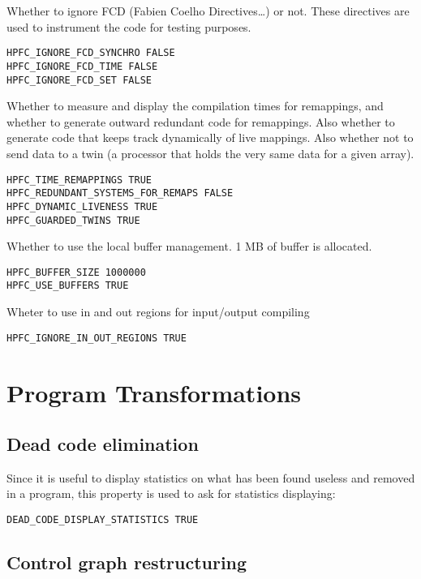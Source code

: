 Whether to ignore FCD (Fabien Coelho Directives\ldots) or not. These
directives are used to instrument the code for testing purposes.

\begin{verbatim}
HPFC_IGNORE_FCD_SYNCHRO FALSE
HPFC_IGNORE_FCD_TIME FALSE
HPFC_IGNORE_FCD_SET FALSE
\end{verbatim}

Whether to measure and display the compilation times for remappings,
and whether to generate outward redundant code for remappings. Also
whether to generate code that keeps track dynamically of live mappings. 
Also whether not to send data to a twin (a processor that holds the very
same data for a given array). 

\begin{verbatim}
HPFC_TIME_REMAPPINGS TRUE
HPFC_REDUNDANT_SYSTEMS_FOR_REMAPS FALSE
HPFC_DYNAMIC_LIVENESS TRUE
HPFC_GUARDED_TWINS TRUE
\end{verbatim}

Whether to use the local buffer management. 1 MB of buffer is allocated.

\begin{verbatim}
HPFC_BUFFER_SIZE 1000000
HPFC_USE_BUFFERS TRUE
\end{verbatim}

Wheter to use in and out regions for input/output compiling

\begin{verbatim}
HPFC_IGNORE_IN_OUT_REGIONS TRUE
\end{verbatim}

\section{Program Transformations}


\subsection{Dead code elimination}

Since it is useful to display statistics on what has been found
useless and removed in a program, this property is used to ask for
statistics displaying:
\begin{verbatim}
DEAD_CODE_DISPLAY_STATISTICS TRUE
\end{verbatim}



\subsection{Control graph restructuring}


